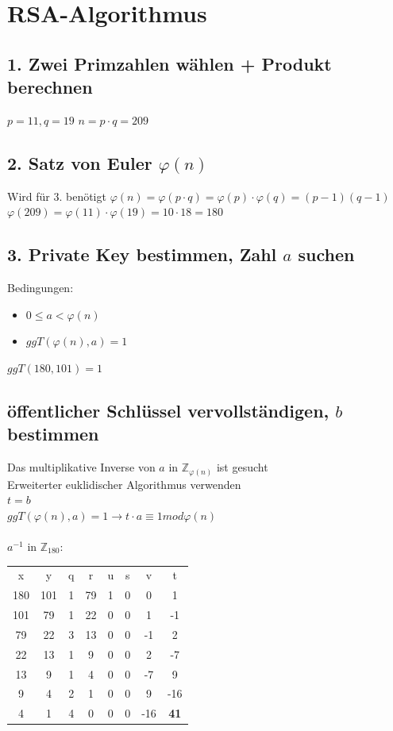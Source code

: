 \documentclass{article}
\newcommand\tab[1][1cm]{\hspace*{#1}}
\begin{document}
\section{RSA-Algorithmus}


\subsection{1. Zwei Primzahlen wählen + Produkt berechnen}
\(p = 11, q = 19\) \tab \(n= p \cdot q = 209\)

\subsection{2. Satz von Euler \(\varphi (n)\)}
Wird für 3. benötigt
\(\varphi(n) = \varphi(p \cdot q) = \varphi(p) \cdot \varphi (q) = (p -1)(q-1)\)\\
\(\varphi(209) = \varphi(11) \cdot \varphi(19) = 10 \cdot 18 = 180\)

\subsection{3. Private Key bestimmen, Zahl \(a\) suchen}
Bedingungen:
\begin{itemize}
    \item \(0\leq a<\varphi(n)\)
    \item \(ggT(\varphi(n),a)=1\)
\end{itemize}
\(ggT(180, 101) = 1\)\\

\subsection{öffentlicher Schlüssel vervollständigen, \(b\) bestimmen}
Das multiplikative Inverse von \(a\) in \(\mathbb{Z}_{\varphi(n)}\) ist gesucht\\
Erweiterter euklidischer Algorithmus verwenden\\
\(t = b\)\\
\(ggT(\varphi(n),a) = 1 \rightarrow t \cdot a \equiv 1 mod \varphi(n)\)\\ \\
\(a^{-1}\) in \(\mathbb{Z}_{180}\):\\
\begin{tabular}{cccc|cccc}
    x & y & q & r &  u & s & v & t\\
    180 & 101 & 1 & 79 & 1 & 0 & 0 & 1\\
     101 & 79 & 1 & 22 &  0 & 0 & 1 & -1\\
     79 & 22 & 3 & 13 &  0 & 0 & -1 & 2\\
     22 & 13 & 1 & 9 & 0 & 0 & 2 & -7\\
     13 & 9 & 1 & 4 & 0 & 0 & -7 & 9\\
     9 & 4 & 2 & 1 & 0 & 0 & 9 & -16\\
     4 & 1 & 4 & 0 & 0 & 0 & -16 & \textbf{41}
\end{tabular}\\ \\
\end{document}
